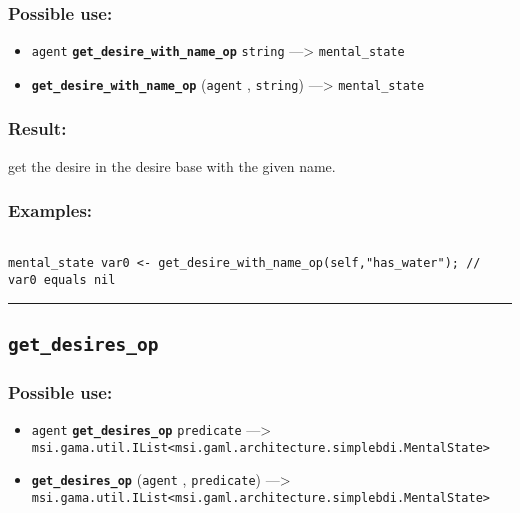 \documentclass[]{book}
\providecommand{\tightlist}{%
  \setlength{\itemsep}{0pt}\setlength{\parskip}{0pt}}
\theoremstyle{definition}
\theoremstyle{definition}
\theoremstyle{definition}
\theoremstyle{remark}
\begin{document}
\subsubsection{Possible use:}\label{possible-use-204}

\begin{itemize}
\tightlist
\item
  \texttt{agent} \textbf{\texttt{get\_desire\_with\_name\_op}}
  \texttt{string} ---\textgreater{} \texttt{mental\_state}
\item
  \textbf{\texttt{get\_desire\_with\_name\_op}} (\texttt{agent} ,
  \texttt{string}) ---\textgreater{} \texttt{mental\_state}
\end{itemize}

\subsubsection{Result:}\label{result-198}

get the desire in the desire base with the given name.

\subsubsection{Examples:}\label{examples-151}

\begin{verbatim}
 
mental_state var0 <- get_desire_with_name_op(self,"has_water"); // var0 equals nil
\end{verbatim}

\begin{center}\rule{0.5\linewidth}{\linethickness}\end{center}

\subsection{\texorpdfstring{\texttt{get\_desires\_op}}{get\_desires\_op}}\label{get_desires_op}

\subsubsection{Possible use:}\label{possible-use-205}

\begin{itemize}
\tightlist
\item
  \texttt{agent} \textbf{\texttt{get\_desires\_op}} \texttt{predicate}
  ---\textgreater{}
  \texttt{msi.gama.util.IList\textless{}msi.gaml.architecture.simplebdi.MentalState\textgreater{}}
\item
  \textbf{\texttt{get\_desires\_op}} (\texttt{agent} ,
  \texttt{predicate}) ---\textgreater{}
  \texttt{msi.gama.util.IList\textless{}msi.gaml.architecture.simplebdi.MentalState\textgreater{}}
\end{itemize}
\end{document}
